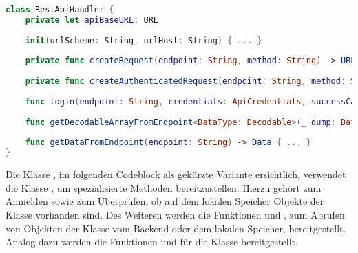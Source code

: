 \begin{lstlisting}[language=Swift]
class RestApiHandler {
    private let apiBaseURL: URL
    
    init(urlScheme: String, urlHost: String) { ... }
    
    private func createRequest(endpoint: String, method: String) -> URLRequest { ... }
    
    private func createAuthenticatedRequest(endpoint: String, method: String, token: String) -> URLRequest { ... }
    
    func login(endpoint: String, credentials: ApiCredentials, successCallback: @escaping (_ result: String)->(), errorCallback: @escaping (_ result: String)->()) { ... }
    
    func getDecodableArrayFromEndpoint<DataType: Decodable>(_ dump: DataType.Type, token: String, endpoint: String, method: String, successCallback: @escaping (_ result: [DataType])->(), errorCallback: @escaping (_ result: String)->()) { ... }
    
    func getDataFromEndpoint(endpoint: String) -> Data { ... }
}
\end{lstlisting}

\clearpage

Die Klasse , im folgenden Codeblock als gekürzte Variante ersichtlich, verwendet die Klasse , um spezialisierte Methoden bereitzustellen.
Hierzu gehört  zum Anmelden sowie  zum Überprüfen, ob auf dem lokalen Speicher Objekte der Klasse  vorhanden sind.
Des Weiteren werden die Funktionen  und , zum Abrufen von Objekten der Klasse  vom Backend oder dem lokalen Speicher, bereitgestellt. Analog dazu werden die Funktionen  und  für die Klasse  bereitgestellt.

